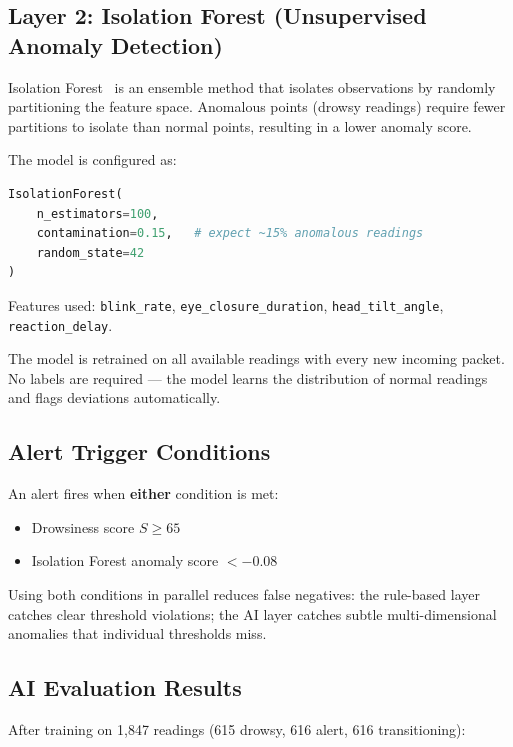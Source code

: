 \documentclass[12pt, a4paper]{article}
\begin{document}
\subsection{Layer 2: Isolation Forest (Unsupervised Anomaly Detection)}

Isolation Forest~\cite{liu2008isolation} is an ensemble method that isolates
observations by randomly partitioning the feature space. Anomalous points
(drowsy readings) require fewer partitions to isolate than normal points,
resulting in a lower anomaly score.

The model is configured as:

\begin{lstlisting}[language=Python, caption={Isolation Forest configuration}]
IsolationForest(
    n_estimators=100,
    contamination=0.15,   # expect ~15% anomalous readings
    random_state=42
)
\end{lstlisting}

Features used: \texttt{blink\_rate}, \texttt{eye\_closure\_duration},
\texttt{head\_tilt\_angle}, \texttt{reaction\_delay}.

The model is retrained on all available readings with every new incoming packet.
No labels are required — the model learns the distribution of normal readings
and flags deviations automatically.

\subsection{Alert Trigger Conditions}

An alert fires when \textbf{either} condition is met:

\begin{itemize}
    \item Drowsiness score $S \geq 65$
    \item Isolation Forest anomaly score $< -0.08$
\end{itemize}

Using both conditions in parallel reduces false negatives: the rule-based
layer catches clear threshold violations; the AI layer catches subtle
multi-dimensional anomalies that individual thresholds miss.

\subsection{AI Evaluation Results}

After training on 1,847 readings (615 drowsy, 616 alert, 616 transitioning):
\end{document}

